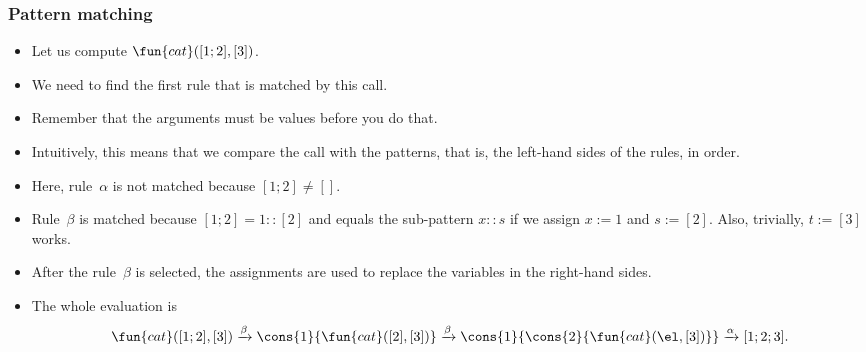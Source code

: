 \documentclass[compress,dvips,xcolor={dvipsnames},t]{beamer}
\begin{document}
\begin{frame}
  \frametitle{Pattern matching}

  \begin{itemize}

    \item Let us compute \(\fun{cat}([1;2],[3])\).

    \item We need to find the first rule that is matched by this call.

    \item Remember that the arguments must be values before you do
      that.

    \item Intuitively, this means that we compare the call with the
      patterns, that is, the left\hyp{}hand sides of the rules, in
      order.

    \item Here, rule~\(\alpha\) is not matched because \([1;2] \neq
      []\).

    \item Rule~\(\beta\) is matched because \([1;2] = 1::[2]\) and
      equals the sub\hyp{}pattern \(x::s\) if we assign \(x := 1\) and
      \(s := [2]\). Also, trivially, \(t := [3]\) works.

    \item After the rule~\(\beta\) is selected, the assignments are
      used to replace the variables in the right\hyp{}hand sides.

    \item The whole evaluation is
    \begin{equation*}
      \fun{cat}([1;2],[3])
      \xrightarrow{\beta}
      \cons{1}{\fun{cat}([2],[3])}
      \xrightarrow{\beta}
      \cons{1}{\cons{2}{\fun{cat}(\el,[3])}}
      \xrightarrow{\alpha} [1;2;3].
    \end{equation*}
  \end{itemize}

\end{frame}
\end{document}
